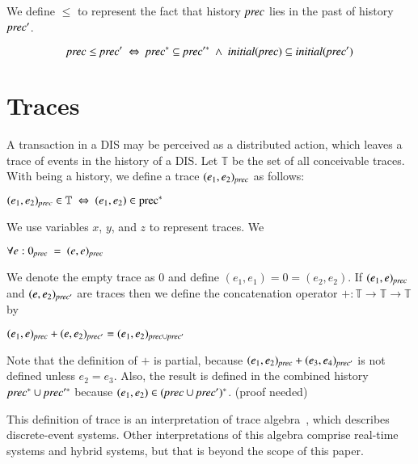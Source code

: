 \documentclass{elsarticle}
\def\id#1{\text{\em #1\/}}
\begin{document}
	We define $\leq$ to represent the fact that history $\id{prec}$ lies in the past of history $\id{prec}'$.
\begin{definition}[$\leq$]
\label{def:lies in the past}
\begin{displaymath}
	\id{prec}\leq\id{prec}'\ \Leftrightarrow\ \id{prec}^*\subseteq\id{prec}'^*\ \wedge\ \id{initial}(\id{prec})\subseteq\id{initial}(\id{prec}')
\end{displaymath}
\end{definition}


\section{Traces}
\label{sct:Traces}
	A transaction in a DIS may be perceived as a distributed action,
	which leaves a trace of events in the history of a DIS.
	Let $\mathbb T$ be the set of all conceivable traces.
	With \id{prec} being a history, we define a trace $(e_1,e_2)_{\id{prec}}$ as follows:
\begin{definition}[Traces]
\label{def:Traces}
\item   $(e_1,e_2)_{\id{prec}}\in\mathbb T\ \Leftrightarrow\ (e_1,e_2)\in\text{prec}^*$
\end{definition}
	We use variables $x$, $y$, and $z$ to represent traces.
	We 
\begin{definition}
\label{def:Empty trace}
\item   $\forall e: 0_{\id{prec}}\ =\ (e,e)_{\id{prec}}$
\end{definition}
	We denote the empty trace as $0$ and define $(e_1,e_1)=0=(e_2,e_2)$.
	If $(e_1,e)_{\id{prec}}$ and $(e,e_2)_{\id{prec}'}$ are traces then
	we define the concatenation operator $+:\mathbb T\rightarrow\mathbb T\rightarrow\mathbb T$ by
\begin{definition}
\label{def:concatenation}
\item   $(e_1,e)_{\id{prec}}+(e,e_2)_{\id{prec}'}=(e_1,e_2)_{\id{prec}\cup\id{prec}'}$
\end{definition}
	Note that the definition of $+$ is partial, because $(e_1,e_2)_{\id{prec}}+(e_3,e_4)_{\id{prec}'}$ is not defined unless $e_2=e_3$.
	Also, the result is defined in the combined history $\id{prec}^*\cup\id{prec}'^*$
	because $(e_1,e_2)\in(\id{prec}\cup\id{prec}')^*$. (proof needed)

	This definition of trace is an interpretation of trace algebra~\cite{Foster17b}, which describes discrete-event systems.
	Other interpretations of this algebra comprise real-time systems and hybrid systems, but that is beyond the scope of this paper.
\end{document}

